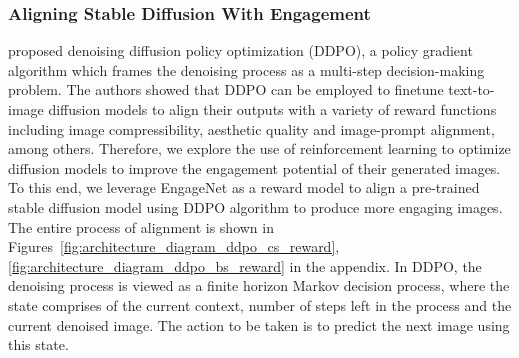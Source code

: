  
 
 
 
 
 
   
 
 
 \subsubsection{Aligning Stable Diffusion With Engagement}
 \label{sec:Performance Aligning Stable Diffusion}

 \citet{black2023training} proposed denoising diffusion policy optimization (DDPO), a policy gradient algorithm which frames the denoising process as a multi-step decision-making problem. The authors showed that DDPO can be employed to finetune text-to-image diffusion models to align their outputs with a variety of reward functions including image compressibility, aesthetic quality and image-prompt alignment, among others. Therefore, we explore the use of reinforcement learning to optimize diffusion models to improve the engagement potential of their generated images. To this end, we leverage EngageNet as a reward model to align a pre-trained stable diffusion model using DDPO algorithm to produce more engaging images. The entire process of alignment is shown in Figures~\ref{fig:architecture_diagram_ddpo_cs_reward}, \ref{fig:architecture_diagram_ddpo_bs_reward} in the appendix. 
  In DDPO, the denoising process is viewed as a finite horizon Markov decision process, where the state comprises of the current context, number of steps left in the process and the current denoised image. The action to be taken is to predict the next image using this state. 
 
